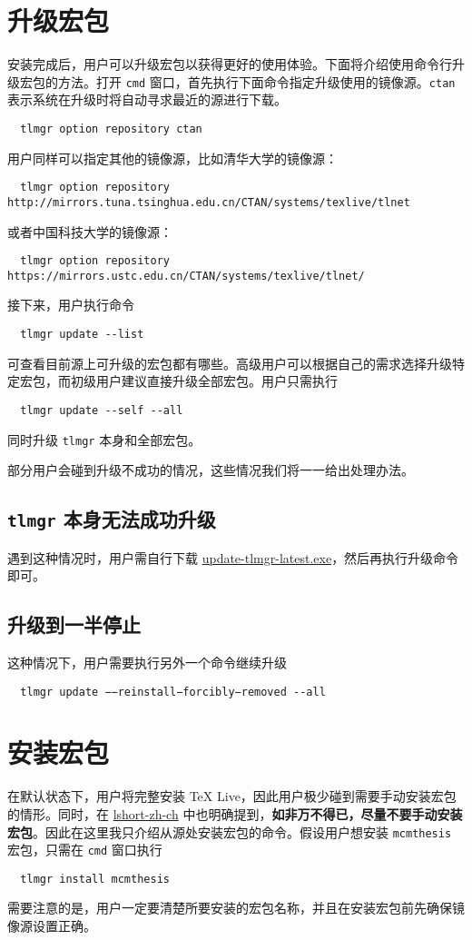 \documentclass{ctexart}
\begin{document}
\section{升级宏包}
安装完成后，用户可以升级宏包以获得更好的使用体验。下面将介绍使用命令行升级宏包的方法。打开 \texttt{cmd} 窗口，首先执行下面命令指定升级使用的镜像源。\texttt{ctan} 表示系统在升级时将自动寻求最近的源进行下载。
\begin{lstlisting}
  tlmgr option repository ctan
\end{lstlisting}
用户同样可以指定其他的镜像源，比如清华大学的镜像源：
\begin{lstlisting}
  tlmgr option repository http://mirrors.tuna.tsinghua.edu.cn/CTAN/systems/texlive/tlnet
\end{lstlisting}
或者中国科技大学的镜像源：
\begin{lstlisting}
  tlmgr option repository https://mirrors.ustc.edu.cn/CTAN/systems/texlive/tlnet/
\end{lstlisting}
接下来，用户执行命令
\begin{lstlisting}
  tlmgr update --list
\end{lstlisting}
可查看目前源上可升级的宏包都有哪些。高级用户可以根据自己的需求选择升级特定宏包，而初级用户建议直接升级全部宏包。用户只需执行
\begin{lstlisting}
  tlmgr update --self --all
\end{lstlisting}
同时升级 \texttt{tlmgr} 本身和全部宏包。

部分用户会碰到升级不成功的情况，这些情况我们将一一给出处理办法。

\subsection{\texttt{tlmgr} 本身无法成功升级}

遇到这种情况时，用户需自行下载 \href{http://mirror.ctan.org/systems/texlive/tlnet/update-tlmgr-latest.exe}{update-tlmgr-latest.exe}，然后再执行升级命令即可。

\subsection{升级到一半停止}

这种情况下，用户需要执行另外一个命令继续升级
\begin{lstlisting}
  tlmgr update −−reinstall−forcibly−removed --all
\end{lstlisting}

\section{安装宏包}
在默认状态下，用户将完整安装 \TeX{} Live，因此用户极少碰到需要手动安装宏包的情形。同时，在 \href{http://mirrors.ctan.org/info/lshort/chinese/lshort-zh-cn.pdf}{lshort-zh-ch} 中也明确提到，\textbf{如非万不得已，尽量不要手动安装宏包}。因此在这里我只介绍从源处安装宏包的命令。假设用户想安装 \texttt{mcmthesis} 宏包，只需在 \texttt{cmd} 窗口执行
\begin{lstlisting}
  tlmgr install mcmthesis
\end{lstlisting}
需要注意的是，用户一定要清楚所要安装的宏包名称，并且在安装宏包前先确保镜像源设置正确。
\end{document}

